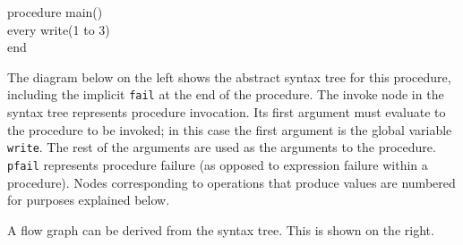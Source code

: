 \goodbreak
\begin{iconcode}
procedure main()\\
\>every write(1 to 3)\\
end\\
\end{iconcode}

\noindent
The diagram below on the left shows the abstract syntax tree for this
procedure, including the implicit \texttt{fail} at the end of the
procedure. The invoke node in the syntax tree represents procedure
invocation. Its first argument must evaluate to the procedure to be
invoked; in this case the first argument is the global variable
\texttt{write}. The rest of the arguments are used as the arguments to the
procedure. \texttt{pfail} represents procedure failure (as opposed to
expression failure within a procedure). Nodes corresponding to
operations that produce values are numbered for purposes explained
below.

A flow graph can be derived from the syntax tree. This is shown on the right. 

